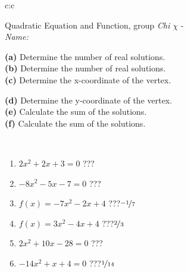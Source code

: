 \documentclass[10pt]{report}
\begin{document}
\begin{tabular}{c:c}
\begin{minipage}[c][104.5mm][t]{0.5\linewidth}
\begin{center}
\vspace{7mm}
{\huge {\LARGE Quadratic Equation and Function}, group \textit{Chi $\chi$} -}\\[5mm]
\textit{Name:}\phantom{xxxxxxxxxxxxxxxxxxxxxxxxxxxxxxxxxxxxxxxxxxxxxxxxxxxxxxxxxxxxxxxxx}\\[5mm]
\begin{minipage}{0.95\linewidth}
\begin{center}
{\small \begin{minipage}{0.5\textwidth}
\textbf{(a)} Determine the number of real solutions. \\[1mm]
\textbf{(b)} Determine the number of real solutions. \\[1mm]
\textbf{(c)} Determine the x-coordinate of the vertex.
\end{minipage} \begin{minipage}{0.49\textwidth}
\textbf{(d)} Determine the y-coordinate of the vertex. \\[1mm]
\textbf{(e)} Calculate the sum of the solutions. \\[1mm]
\textbf{(f)} Calculate the sum of the solutions.
\end{minipage}
}
\end{center}
\end{minipage}
\\[4mm]
\begin{minipage}{0.79\linewidth}
\begin{center}
\begin{varwidth}{\linewidth}
\begin{enumerate}
\Large
\item $2x^2+2x+3=0$\quad \dotfill\; ???\;\dotfill {}
\item $-8x^2-5x-7=0$\quad \dotfill\; ???\;\dotfill {}
\item $f(x)=-7x^2-2x+4$\quad \dotfill\; ???\;\dotfill \quad $\nicefrac{-1}{7}$
\item $f(x)=3x^2-4x+4$\quad \dotfill\; ???\;\dotfill \quad $\nicefrac{2}{3}$
\item $2x^2+10x-28=0$\quad \dotfill\; ???\;\dotfill {}
\item $-14x^2+x+4=0$\quad \dotfill\; ???\;\dotfill \quad $\nicefrac{1}{14}$
\end{enumerate}
\end{varwidth}

\end{center}
\end{minipage}
\end{center}
\end{minipage}
\end{tabular}
\end{document}
